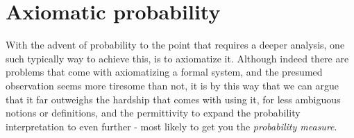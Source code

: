 
\section{Axiomatic probability}
With the advent of probability to the point that requires a deeper analysis, one such typically way to achieve this, is to axiomatize it. Although indeed there are problems that come with axiomatizing a formal system, and the presumed observation seems more tiresome than not, it is by this way that we can argue that it far outweighs the hardship that comes with using it, for less ambiguous notions or definitions, and the permittivity to expand the probability interpretation to even further - most likely to get you the \textit{probability measure}. 
